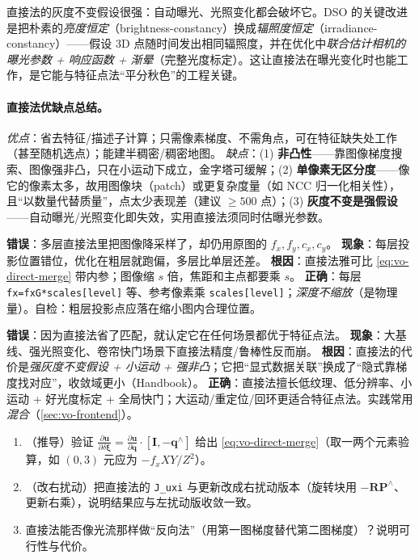 \begin{insight}
直接法的灰度不变假设很强：自动曝光、光照变化都会破坏它。DSO\cite{carlone2026handbook} 的关键改进是把朴素的\emph{亮度恒定}（brightness-constancy）换成\emph{辐照度恒定}（irradiance-constancy）——假设 3D 点随时间发出相同辐照度，并在优化中\emph{联合估计相机的曝光参数 + 响应函数 + 渐晕}（完整光度标定）。这让直接法在曝光变化时也能工作，是它能与特征点法“平分秋色”的工程关键。
\end{insight}

\paragraph{直接法优缺点总结\cite{gaoxiang2019slam14}。}
\emph{优点}：省去特征/描述子计算；只需像素梯度、不需角点，可在特征缺失处工作（甚至随机选点）；能建半稠密/稠密地图。
\emph{缺点}：(1) \textbf{非凸性}——靠图像梯度搜索、图像强非凸，只在小运动下成立，金字塔可缓解；(2) \textbf{单像素无区分度}——像它的像素太多，故用图像块（patch）或更复杂度量（如 NCC 归一化相关性），且“以数量代替质量”，点太少表现差（建议 $\ge500$ 点）；(3) \textbf{灰度不变是强假设}——自动曝光/光照变化即失效，实用直接法须同时估曝光参数。

\begin{pitfall}
\textbf{错误}：多层直接法里把图像降采样了，却仍用原图的 $f_x,f_y,c_x,c_y$。
\textbf{现象}：每层投影位置错位，优化在粗层就跑偏，多层比单层还差。
\textbf{根因}：直接法雅可比 \cref{eq:vo-direct-merge} 带内参；图像缩 $s$ 倍，焦距和主点都要乘 $s$。
\textbf{正确}：每层 \texttt{fx=fxG*scales[level]} 等、参考像素乘 \texttt{scales[level]}；\emph{深度不缩放}（是物理量）。自检：粗层投影点应落在缩小图内合理位置。
\end{pitfall}

\begin{pitfall}
\textbf{错误}：因为直接法省了匹配，就认定它在任何场景都优于特征点法。
\textbf{现象}：大基线、强光照变化、卷帘快门场景下直接法精度/鲁棒性反而崩。
\textbf{根因}：直接法的代价是\emph{强灰度不变假设 + 小运动 + 强非凸}；它把“显式数据关联”换成了“隐式靠梯度找对应”，收敛域更小（Handbook\cite{carlone2026handbook}）。
\textbf{正确}：直接法擅长低纹理、低分辨率、小运动 + 好光度标定 + 全局快门；大运动/重定位/回环更适合特征点法。实践常用\emph{混合}（\cref{sec:vo-frontend}）。
\end{pitfall}

\begin{practice}
\begin{enumerate}
  \item （推导）验证 $\frac{\partial\mathbf{u}}{\partial\delta\boldsymbol{\xi}}=\frac{\partial\mathbf{u}}{\partial\mathbf{q}}\cdot[\mathbf{I},-\mathbf{q}^\wedge]$ 给出 \cref{eq:vo-direct-merge}（取一两个元素验算，如 $(0,3)$ 元应为 $-f_xXY/Z^2$）。
  \item （改右扰动）把直接法的 \texttt{J\_uxi} 与更新改成右扰动版本（旋转块用 $-\mathbf{R}\mathbf{P}^\wedge$、更新右乘），说明结果应与左扰动版收敛一致。
  \item 直接法能否像光流那样做“反向法”（用第一图梯度替代第二图梯度）？说明可行性与代价。
\end{enumerate}
\end{practice}

